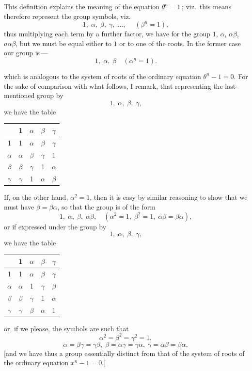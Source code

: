 \documentclass[11pt,a4paper]{article}
\theoremstyle{definition}
\begin{document}
\medskip

This definition explains the meaning of the equation $\theta^n=1$\,; viz.\ this means therefore
represent the group symbols, viz.\
\[
1,\;\alpha,\;\beta,\;\gamma,\;\ldots,\;\quad (\beta^n = 1),
\]
thus multiplying each term by a further factor, we have for the group $1$, $\alpha$, $\alpha\beta$,
$a\alpha\beta$, but we must be equal either to $1$ or to one of the roots. In the former case our
group is\,---
\[
1,\;\alpha,\;\beta\quad(\alpha^n=1).
\]

\noindent which is analogous to the system of roots of the ordinary equation $\theta^n - 1 = 0$. For
the sake of comparison with what follows, I remark, that representing the last-
mentioned group by
\[
1,\;\alpha,\;\beta,\;\gamma,
\]
we have the table
\medskip
\begin{center}
\begin{tabular}{c|cccc}
 & 1 & $\alpha$ & $\beta$ & $\gamma$ \\\hline
1 & 1 & $\alpha$ & $\beta$ & $\gamma$ \\
$\alpha$ & $\alpha$ & $\beta$ & $\gamma$ & 1 \\
$\beta$ & $\beta$ & $\gamma$ & 1 & $\alpha$ \\
$\gamma$ & $\gamma$ & 1 & $\alpha$ & $\beta$
\end{tabular}
\end{center}

\medskip

If, on the other hand, $\alpha^2=1$, then it is easy by similar reasoning to show that we
must have $\beta=\beta\alpha$, so that the group is of the form
\[
1,\;\alpha,\;\beta,\;\alpha\beta,\quad(\alpha^2=1,\;\beta^2=1,\;\alpha\beta=\beta\alpha),
\]
or if expressed under the group by
\[
1,\;\alpha,\;\beta,\;\gamma,
\]
we have the table
\medskip
\begin{center}
\begin{tabular}{c|cccc}
 & 1 & $\alpha$ & $\beta$ & $\gamma$ \\\hline
1 & 1 & $\alpha$ & $\beta$ & $\gamma$ \\
$\alpha$ & $\alpha$ & 1 & $\gamma$ & $\beta$ \\
$\beta$ & $\beta$ & $\gamma$ & 1 & $\alpha$ \\
$\gamma$ & $\gamma$ & $\beta$ & $\alpha$ & 1
\end{tabular}
\end{center}

\medskip

or, if we please, the symbols are such that
\[
\alpha^2 = \beta^2 = \gamma^2 = 1,
\]
\[
\alpha = \beta\gamma = \gamma\beta,\;\beta = \alpha\gamma = \gamma\alpha,\;\gamma = \alpha\beta = \beta\alpha,
\]
[and we have thus a group essentially distinct from that of the system of roots of
the ordinary equation $x^n - 1 = 0$.]
\end{document}
